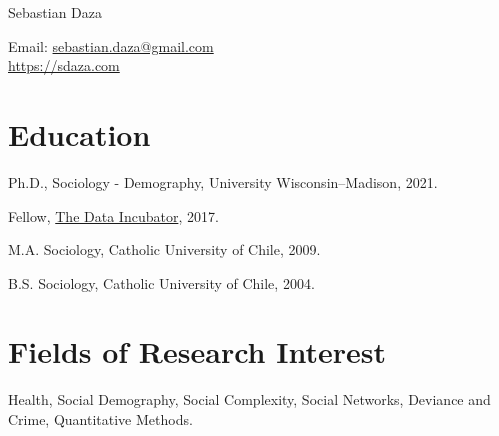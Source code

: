 \documentclass[10pt,letterpaper]{article}
\def\name{Sebastian Daza}
\renewenvironment{itemize}{
  \begin{list}{}{
    \setlength{\leftmargin}{1.5em}
    \setlength{\itemsep}{0.25em}
    \setlength{\parskip}{0pt}
    \setlength{\parsep}{0.25em}
  }
}{
  \end{list}
}
\begin{document}

\centerline{\huge \name}

\bigskip
\bigskip

\begin{minipage}[t]{0.3\textwidth}
  Email: \href{mailto:sebastian.daza@gmail.com}{sebastian.daza@gmail.com} \\
  \href{https://sdaza.com/}{https://sdaza.com} \\

\end{minipage}

\bigskip
\bigskip

\section*{Education}

\begin{itemize}
  \item Ph.D., Sociology - Demography, University Wisconsin--Madison, 2021.
  \item Fellow, \href{https://www.thedataincubator.com/fellowship.html}{The Data Incubator}, 2017.
  \item M.A. Sociology, Catholic University of Chile, 2009.
  \item B.S. Sociology, Catholic University of Chile, 2004.
\end{itemize}

\section*{Fields of Research Interest}

\begin{itemize}
\item  Health, Social Demography, Social Complexity, Social Networks, Deviance and Crime, Quantitative Methods.
\end{itemize}
\end{document}
